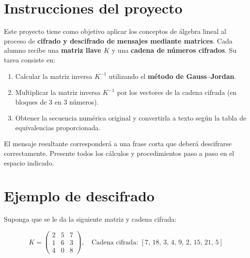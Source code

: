 \documentclass{article}%
\renewcommand\normalsize{\fontsize{12}{14}\selectfont}%
\begin{document}
%
\normalsize%
\section*{Instrucciones del proyecto}

Este proyecto tiene como objetivo aplicar los conceptos de álgebra lineal al proceso de
\textbf{cifrado y descifrado de mensajes mediante matrices}.
Cada alumno recibe una \textbf{matriz llave $K$} y una \textbf{cadena de números cifrados}.
Su tarea consiste en:

\begin{enumerate}
    \item Calcular la matriz inversa $K^{-1}$ utilizando el \textbf{método de Gauss–Jordan}.
    \item Multiplicar la matriz inversa $K^{-1}$ por los vectores de la cadena cifrada (en bloques de 3 en 3 números).
    \item Obtener la secuencia numérica original y convertirla a texto según la tabla de equivalencias proporcionada.
\end{enumerate}

El mensaje resultante corresponderá a una frase corta que deberá descifrarse correctamente.
Presente todos los cálculos y procedimientos paso a paso en el espacio indicado.

\bigskip

\section*{Ejemplo de descifrado}

Suponga que se le da la siguiente matriz y cadena cifrada:

\[
K =
\begin{pmatrix}
2 & 5 & 7 \\
1 & 6 & 3 \\
4 & 0 & 8
\end{pmatrix},
\quad
\text{Cadena cifrada: } [7,\, 18,\, 3,\, 4,\, 9,\, 2,\, 15,\, 21,\, 5]
\]
\end{document}
